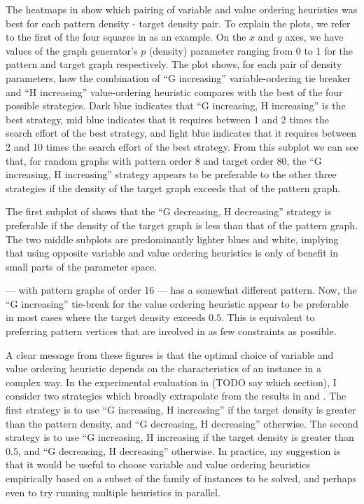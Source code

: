 The heatmaps in  show which pairing of variable and value
ordering heuristics was best for each pattern density - target density pair.  To explain
the plots, we refer to the first of the four squares in 
as an example.  On the $x$ and $y$ axes, we have values of the graph generator's $p$
(density) parameter ranging from 0 to 1 for the pattern
and target graph respectively.  The plot shows, for each pair of density
parameters, how the combination of ``G increasing'' variable-ordering tie breaker
and ``H increasing'' value-ordering heuristic compares with the best of the four
possible strategies.  Dark blue indicates that ``G increasing, H increasing'' is
the best strategy, mid blue indicates that it requires between 1 and 2 times the search
effort of the best strategy, and light blue indicates that it requires between 2 and
10 times the search effort of the best strategy.  From this subplot we can see that,
for random graphs with pattern order 8 and target order 80, the ``G increasing,
H increasing'' strategy appears to be preferable to the other three strategies
if the density of the target graph exceeds that of the pattern graph.

The first subplot of
shows that the ``G decreasing, H decreasing'' strategy is
preferable if the density of the target graph is less than that of the pattern graph.
The two middle subplots are predominantly lighter blues and white, implying that
using opposite variable and value ordering heuristics is only of benefit in small
parts of the parameter space.

 --- with pattern graphs of order 16 --- has a somewhat different
pattern.  Now, the ``G increasing'' tie-break for the value ordering heuristic
appear to be preferable in most cases where the target density exceeds $0.5$.  This is equivalent
to preferring pattern vertices that are involved in as few constraints as possible.

A clear message from these figures is that the optimal choice of variable and
value ordering heuristic depends on the characteristics of an instance in a
complex way.
In the experimental evaluation in (TODO say which section), I consider two 
strategies which broadly extrapolate from the results in
 and
.  The first strategy is to use ``G increasing, H increasing''
if the target density is greater than the pattern density, and ``G decreasing, H decreasing''
otherwise.  The second strategy is to use ``G increasing, H increasing if the target
density is greater than $0.5$, and ``G decreasing, H decreasing'' otherwise.
In practice, my suggestion is that it would be useful to choose
variable and value ordering heuristics empirically based on a subset of the family
of instances to be solved, and perhaps even to try running multiple heuristics
in parallel.

